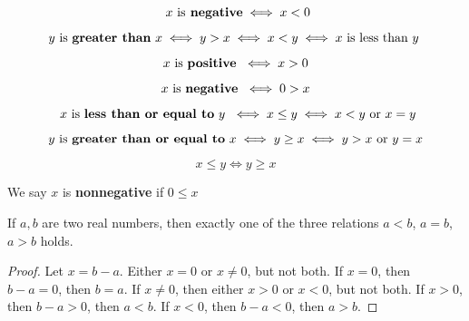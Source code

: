 \documentclass{report}
\begin{document}
\begin{corollary}
\begin{equation}
  \text{  $x$ is\textbf{ negative}}\iff x<0
\end{equation}
\end{corollary}
\begin{definition}
  \begin{equation}
 y\text{ is \textbf{greater than} }x\iff y>x\iff x<y \iff x\text{ is less than $y$ }
  \end{equation}
\end{definition}
\begin{corollary}
\begin{equation}
x\text{ is \textbf{positive} }\iff x>0
\end{equation}
\end{corollary}
\begin{corollary}
\begin{equation}
x\text{ is \textbf{negative} }\iff 0>x
\end{equation}
\end{corollary}
\begin{definition}
  \begin{equation}
\text{ $x$ is \textbf{less than or equal to} $y$ }\iff x\leq y\iff x<y\text{ or }x=y
  \end{equation}
\end{definition} 
\begin{definition}
  \begin{equation}
  y\text{ is  \textbf{greater than or equal to} }x\iff y\geq x\iff y>x\text{ or }y=x
  \end{equation}
\end{definition}
\begin{theorem}
\begin{equation}
x\leq y\iff y\geq x
\end{equation} 
\end{theorem}
\begin{definition}
We say $x$ is \textbf{nonnegative} if $0\leq x$
\end{definition}
\begin{theorem}
If  $a,b$ are two real numbers, then exactly one of the three relations $a<b$, $a=b$, $a>b$ holds. 
\end{theorem}
\begin{proof}
Let $x=b-a$. Either $x=0$ or $x\neq 0$, but not both. If $x=0$, then $b-a=0$, then $b=a$. If $x\neq 0$, then either $x>0$ or $x<0$, but not both. If $x>0$, then $b-a>0$, then $a<b$. If $x<0$, then $b-a<0$, then $a>b$.
\end{proof}
\end{document}
